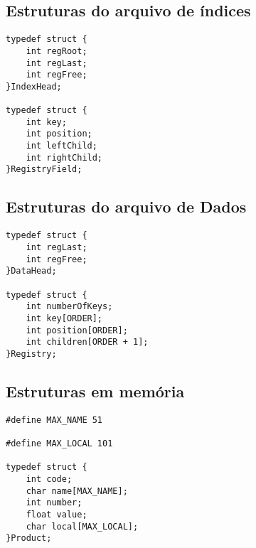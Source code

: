 \documentclass[12pt, a4paper]{article}
\begin{document}
\subsection{Estruturas do arquivo de índices}\label{Estruturas do arquivo de índices}
\begin{lstlisting}[title=Dados gravados no arquivo ``index.bin'']
typedef struct {
    int regRoot;
    int regLast;
    int regFree;
}IndexHead;

typedef struct {
    int key;
    int position;
    int leftChild;
    int rightChild;
}RegistryField;
\end{lstlisting}

\subsection{Estruturas do arquivo de Dados}\label{Estruturas do arquivo de Dados}
\begin{lstlisting}[title=Dados gravados no arquivo ``data.bin'']
typedef struct {
    int regLast;
    int regFree;
}DataHead;

typedef struct {
    int numberOfKeys;
	int key[ORDER];
	int position[ORDER];
	int children[ORDER + 1];
}Registry;
\end{lstlisting}

\subsection{Estruturas em memória}\label{Estruturas em memória}
\begin{lstlisting}
#define MAX_NAME 51

#define MAX_LOCAL 101

typedef struct {
    int code;
    char name[MAX_NAME];
    int number;
    float value;
    char local[MAX_LOCAL];
}Product;
\end{lstlisting}
\end{document}
